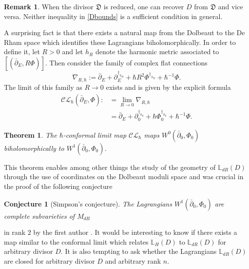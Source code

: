 \documentclass[twoside, 11pt]{article}
\numberwithin{equation}{section}
\theoremstyle{theorem}
\newtheorem{theorem}{Theorem}
\numberwithin{theorem}{section}
\newtheorem{conjecture}[conjecture]{Conjecture}
\theoremstyle{definition}
\newtheorem{remark}[remark]{Remark}
\newcommand{\pa}{\partial}
\begin{document}
%
%
\begin{remark}
When the divisor $\mathfrak D$ is reduced, one can recover $D$ from $\mathfrak D$ and vice versa. Neither inequality in \ref{Dbounds} is a sufficient condition in general. 
\end{remark}
%

A surprising fact is that there exists a natural map from the Dolbeaut to the De Rham space which identifies these Lagrangians biholomorphically. In order to define it, let $R>0$ and let $h_R$ denote the harmonic metric associated to $[(\bar\pa_E,R\Phi)]$. Then consider the family of complex flat connections 
%
\begin{equation*}
\nabla_{R,\hbar} := \bar\pa_E + \pa_E^{\dagger_{h_R}} + \hbar R^2 \Phi^{\dagger_{h_R}} + \hbar^{-1}\Phi.
\end{equation*}
%
The limit of this family as $R\to 0$ exists and is given by the explicit formula 
%
\begin{equation*}
\begin{split}
\mathcal {CL}_{\hbar}(\bar\pa_E,\Phi):&= \lim\limits_{R\to 0} \nabla_{R,\hbar}\\
&= \bar\pa_E + \pa_0^{\dagger_{h_0}} + \hbar \Phi_0^{\dagger_{h_0}} + \hbar^{-1}\Phi.
\end{split}
\end{equation*}
%

%
\begin{theorem}
The $\hbar$-conformal limit map $\mathcal {CL}_{\hbar}$ maps $W^0(\bar\pa_0,\Phi_0)$ biholomorphically to $W^1(\bar\pa_0,\Phi_0)$.
\end{theorem}
%
This theorem enables among other things the study of the geometry of $\mathbb L_{dR}(D)$ through the use of coordinates on the Dolbeaut moduli space and was crucial in the proof of the following conjecture 
%
\begin{conjecture}[Simpson's conjecture] 
The Lagrangians $W^1(\bar\pa_0,\Phi_0)$ are complete subvarieties of $M_{dR}$
\end{conjecture}
%

\vspace{5pt}
\noindent
in rank $2$ by the first author \cite{DS24}. It would be interesting to know if there exists a map similar to the conformal limit which relates $\mathbb L_H(D)$ to $\mathbb L_{dR}(D)$ for arbitrary divisor $D$. It is also tempting to ask whether the Lagrangians $\mathbb L_{dR}(D)$ are closed for arbitrary divisor $D$ and arbitrary rank $n$. 
\end{document}

